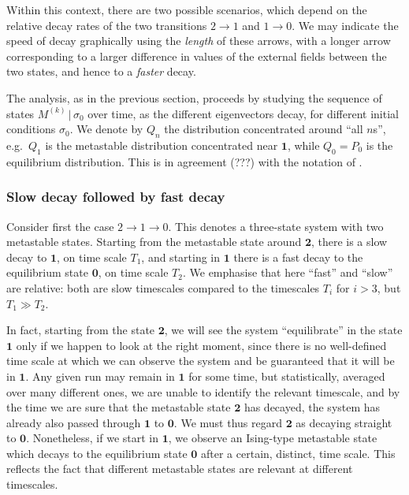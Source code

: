 \documentclass[10pt]{article}
\newcommand{\zeros}{\mathbf{0}}
\newcommand{\ones}{\mathbf{1}}
\newcommand{\twos}{\mathbf{2}}
\newcommand{\given}{\, | \,}
\newcommand{\M}[1]{M^{(#1)}}
\begin{document}
Within this context, there are two possible scenarios, which
 depend on the relative decay rates of the
two transitions $2 \to 1$ and $1 \to 0$. 
We may indicate the speed of decay graphically using the \emph{length} of these arrows, with 
a longer arrow corresponding to a larger difference in values of the external fields between the two states, and hence to a 
\emph{faster} decay.

The analysis, as in the previous section, proceeds by studying the sequence of states $\M{k} \given \sigma_0$
over time, as the different eigenvectors decay, for different initial conditions
$\sigma_0$.
We denote by $Q_n$ the distribution concentrated around ``all
$n$s'', e.g.\ $Q_1$ is the metastable distribution concentrated near $\ones$, while $Q_0 =
P_0$ is the equilibrium distribution.  This is in agreement (???) with the
notation of \cite{LarraldeLeyvrazSandersJStatMech2006}.



\subsubsection{Slow decay followed by fast decay}

Consider first the case $2 \rightarrow 1 \longrightarrow 0$.
This denotes a three-state system with two metastable states. 
Starting from the metastable state around $\twos$, there is a slow decay to $\ones$, on time scale $T_1$, and starting in
$\ones$ there is a fast decay to the equilibrium state $\zeros$, on time scale $T_2$.  
We emphasise that here ``fast'' and ``slow'' are relative: both are slow
timescales compared to the timescales $T_i$ for $i>3$, but $T_1 \gg T_2$.

In fact, starting from the state $\twos$, we will see the system ``equilibrate'' in the state $\ones$ only if we happen to look at the right moment, since there is no well-defined time scale at which we can observe the system and be guaranteed that it will be in $\ones$. Any given run may remain in $\ones$ for some time, but statistically, averaged over many different ones, we are unable to identify the relevant timescale, and by the time we are sure that
the metastable state $\twos$ has decayed, the system has already also passed
through $\ones$ to $\zeros$. We must thus regard $\twos$ as decaying  straight to $\zeros$.
Nonetheless, if we start in $\ones$, we observe an
Ising-type metastable state which decays to the equilibrium state $\zeros$
after a certain, distinct, time scale. This reflects the fact that different metastable
states are relevant at different timescales. 
\end{document}
